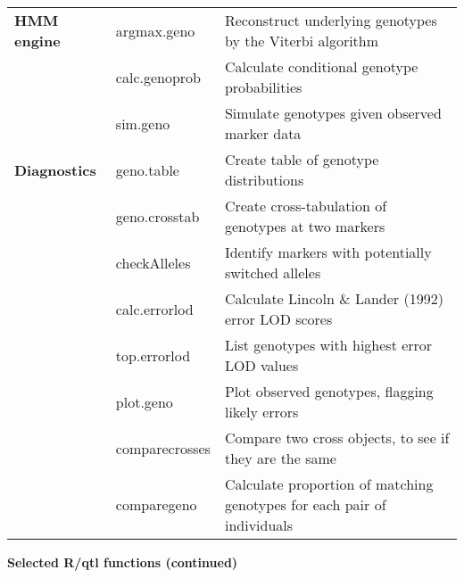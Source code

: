 \documentclass[10pt,letterpaper]{article}
\begin{document}
\begin{tabular}{lll}
\textbf{HMM engine} 
& argmax.geno & Reconstruct underlying genotypes by the Viterbi
algorithm \\ 
& calc.genoprob & Calculate conditional genotype probabilities \\ 
& sim.geno & Simulate genotypes given observed marker data \\ 
\hline

\textbf{Diagnostics} 
& geno.table & Create table of genotype distributions \\ 
& geno.crosstab & Create cross-tabulation of genotypes at two markers \\
& checkAlleles & Identify markers with potentially switched alleles \\
& calc.errorlod & Calculate Lincoln \& Lander (1992) error LOD scores \\
& top.errorlod & List genotypes with highest error LOD values \\ 
& plot.geno & Plot observed genotypes, flagging likely errors \\ 
& comparecrosses & Compare two cross objects, to see if they are the same \\
& comparegeno & Calculate proportion of matching genotypes for each
pair of individuals \\
\hline

\end{tabular}

\newpage

\noindent \textbf{Selected R/qtl functions (continued)} 
\end{document}
